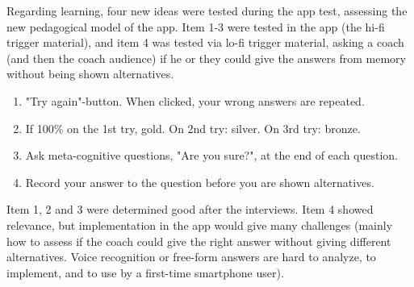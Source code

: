   Regarding learning, four new ideas were tested during the app test, assessing the new pedagogical model of the app. Item 1-3 were tested in the app (the hi-fi trigger material), and item 4 was tested via lo-fi trigger material, asking a coach (and then the coach audience) if he or they could give the answers from memory without being shown alternatives.

  \begin{enumerate}
  \item "Try again"-button. When clicked, your wrong answers are repeated.
  \item If 100\% on the 1st try, gold. On 2nd try: silver. On 3rd try: bronze.
  \item Ask meta-cognitive questions, "Are you sure?", at the end of each question.
  \item Record your answer to the question before you are shown alternatives.
  \end{enumerate}

  Item 1, 2 and 3 were determined good after the interviews. Item 4 showed relevance, but implementation in the app would give many challenges (mainly how to assess if the coach could give the right answer without giving different alternatives. Voice recognition or free-form answers are hard to analyze, to implement, and to use by a first-time smartphone user).
